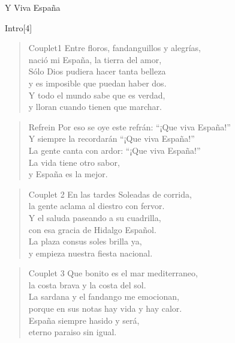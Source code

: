 \begin{song}{Y Viva España}
\small

\begin{instrumental}{Intro}[4]
\end{instrumental}

\begin{verse}{Couplet1}
Entre floros, fandanguillos y alegrías,\\
nació mi España, la tierra del amor,\\
Sólo Dios pudiera hacer tanta belleza\\
y es imposible que puedan haber dos.\\
Y todo el mundo sabe que es verdad,\\
y lloran cuando tienen que marchar.
\end{verse}


\begin{verse}{Refrein}
Por eso se oye este refrán: 
``¡Que viva España!''\\
Y siempre la recordarán\chord{} 
``¡Que viva España!''\\
La gente canta con ardor:\chord{} 
``¡Que viva España!''\\
La vida tiene otro sabor,\chord{}\\
y España es la mejor.
\end{verse}

\begin{verse}{Couplet 2}
En las tardes Soleadas de corrida,\\
la gente aclama al diestro con fervor.\\
Y el saluda paseando a su cuadrilla,\\
con esa gracia de Hidalgo Español.\\
La plaza consus soles brilla ya,\\
y empieza nuestra fiesta nacional.
\end{verse}


\begin{verse}{Couplet 3}
Que bonito es el mar mediterraneo,\\
la costa brava y la costa del sol.\\
La sardana y el fandango me emocionan,\\
porque en sus notas hay vida y hay calor.\\
España siempre hasido y será,\\
eterno paraiso sin igual.
\end{verse}


\end{song}
